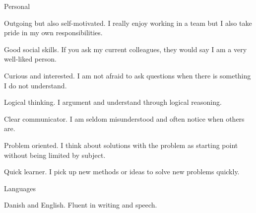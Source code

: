 \begin{cvskills}

\cvskill
{Personal} %
{
\begin{cvitems}
\item {Outgoing but also self-motivated. I really enjoy working in a team but I also take pride in my own responsibilities.}
\item {Good social skills. If you ask my current colleagues, they would say I am a very well-liked person.}
\item {Curious and interested. I am not afraid to ask questions when there is something I do not understand.}
\item {Logical thinking. I argument and understand through logical reasoning.}
\item {Clear communicator. I am seldom misunderstood and often notice when others are.}
\item {Problem oriented. I think about solutions with the problem as starting point without being limited by subject.}
\item {Quick learner. I pick up new methods or ideas to solve new problems quickly.}
\end{cvitems}} %




\cvskill
{Languages} %
{
\begin{cvitems}
 \vspace{2mm}
\item {Danish and English. Fluent in writing and speech.}
\end{cvitems}
}
\end{cvskills}
